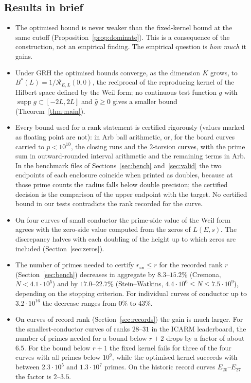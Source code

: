 \documentclass[11pt]{amsart}
\theoremstyle{remark}
\theoremstyle{definition}
\newcommand{\Rad}{\mathcal{R}_{E,L}}
\newcommand{\ran}{r_{\mathrm{an}}}
\DeclareMathOperator{\supp}{supp}
\begin{document}
\subsection*{Results in brief}
\begin{itemize}
\item The optimised bound is never weaker than the fixed-kernel bound at the same cutoff (Proposition~\ref{prop:dominate}). This is a consequence of the construction, not an empirical finding. The empirical question is \emph{how much} it gains.
\item Under GRH the optimised bounds converge, as the dimension $K$ grows, to $B^*(L)=1/\Rad(0,0)$, the reciprocal of the reproducing kernel of the Hilbert space defined by the Weil form; no continuous test function $g$ with $\supp g\subset[-2L,2L]$ and $\hat g\ge0$ gives a smaller bound (Theorem~\ref{thm:main}).
\item Every bound used for a rank statement is certified rigorously (values marked as floating point are not): in Arb ball arithmetic, or, for the board curves carried to $p<10^{10}$, the closing runs and the $2$-torsion curves, with the prime sum in outward-rounded interval arithmetic and the remaining terms in Arb. In
the benchmark files of Sections~\ref{sec:bench} and~\ref{sec:valid} the two endpoints of each
enclosure coincide when printed as doubles, because at those prime counts the radius falls below
double precision; the certified decision is the comparison of the upper endpoint with the target. No certified bound in our tests contradicts the rank recorded for the curve.
\item On four curves of small conductor the prime-side value of the Weil form agrees with the zero-side value computed from the zeros of $L(E,s)$. The discrepancy halves with each doubling of the height up to which zeros are included (Section~\ref{sec:zeros}).
\item The number of primes needed to certify $\ran\le r$ for the recorded rank $r$ (Section~\ref{sec:bench}) decreases in aggregate by $8.3$--$15.2\%$ (Cremona, $N<4.1\cdot 10^5$) and by $17.0$--$22.7\%$ (Stein--Watkins, $4.4\cdot10^6\le N\le 7.5\cdot 10^9$), depending on the stopping criterion. For individual curves of conductor up to $3.2\cdot 10^{16}$ the decrease ranges from $0\%$ to $43\%$.
\item On curves of record rank (Section~\ref{sec:records}) the gain is much larger. For the smallest-conductor curves of ranks $28$--$31$ in the ICARM leaderboard, the number of primes needed for a bound below $r+2$ drops by a factor of about $6.5$. For the bound below $r+1$ the fixed kernel fails for three of the four curves with all primes below $10^9$, while the optimised kernel succeeds with between $2.3\cdot10^5$ and $1.3\cdot10^7$ primes. On the historic record curves $E_{20}$--$E_{27}$ the factor is $2$--$3.5$.

\end{itemize}
\end{document}

